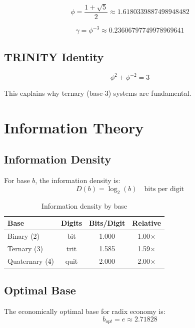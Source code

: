 \documentclass[12pt,a4paper]{article}
\begin{document}
\begin{equation}
\phi = \frac{1+\sqrt{5}}{2} \approx 1.6180339887498948482
\end{equation}

\begin{equation}
\gamma = \phi^{-3} \approx 0.23606797749978969641
\end{equation}

\subsection{TRINITY Identity}

\begin{equation}
\phi^2 + \phi^{-2} = 3
\end{equation}

This explains why ternary (base-3) systems are fundamental.

\section{Information Theory}

\subsection{Information Density}

For base $b$, the information density is:
\begin{equation}
D(b) = \log_2(b) \quad \text{bits per digit}
\end{equation}

\begin{table}[h]
\centering
\begin{tabular}{lccc}
\toprule
Base & Digits & Bits/Digit & Relative \\
\midrule
Binary (2) & bit & 1.000 & 1.00$\times$ \\
Ternary (3) & trit & 1.585 & 1.59$\times$ \\
Quaternary (4) & quit & 2.000 & 2.00$\times$ \\
\bottomrule
\end{tabular}
\caption{Information density by base}
\end{table}

\subsection{Optimal Base}

The economically optimal base for radix economy is:
\begin{equation}
b_{opt} = e \approx 2.71828
\end{equation}
\end{document}
